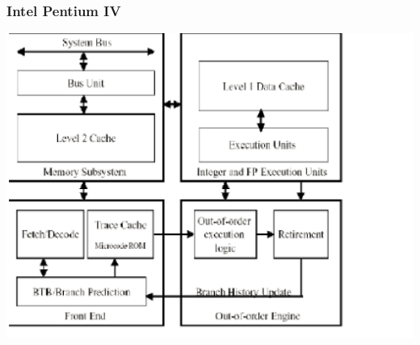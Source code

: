 \documentclass{beamer}
\begin{document}
\begin{frame}[fragile,t]
\frametitle{Intel Pentium IV}

\includegraphics[width=62ex]{FigsOoOProc/Pentium4HL.pdf}

\end{frame}
\end{document}
